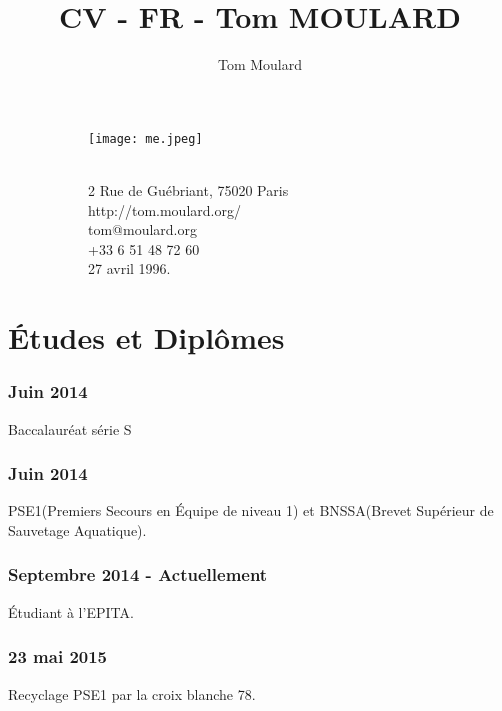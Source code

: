 \documentclass{article}
\begin{document}
    \title{CV - FR - Tom MOULARD}

    \author{Tom Moulard}

    \begin{center}
        \begin{figure}
            \centering
            \begin{subfigure}[b]{0.3\textwidth}
                \texttt{[image: me.jpeg]}
            \end{subfigure}
            \begin{subfigure}[b]{0.3\textwidth}
                {\huge\bfseries\theauthor}\\
                \vspace{.25em}
                2 Rue de Gu\'ebriant, 75020 Paris\\
                http://tom.moulard.org/\\
                tom@moulard.org\\
                +33 6 51 48 72 60\\
                27 avril 1996.
            \end{subfigure}
        \end{figure}
    \end{center}

    \hspace{-.25em}
    \section{\'Etudes et Dipl\^omes}
        \subsubsection{Juin 2014}
            Baccalaur\'eat s\'erie S
        \subsubsection{Juin 2014}
            PSE1(Premiers Secours en \'Equipe de niveau 1) et BNSSA(Brevet Sup\'erieur de Sauvetage Aquatique).
        \subsubsection{Septembre 2014 - Actuellement}
            \'Etudiant \`a l'EPITA.
        \subsubsection{23 mai 2015}
            Recyclage PSE1 par la croix blanche 78.
\end{document}
